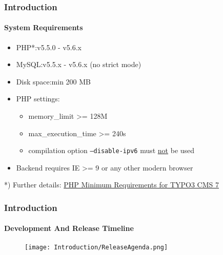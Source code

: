 
\begin{frame}[fragile]
	\frametitle{Introduction}
	\framesubtitle{System Requirements}

	\begin{itemize}
		\item PHP*:\tabto{2.2cm}v5.5.0 - v5.6.x
		\item MySQL:\tabto{2.2cm}v5.5.x - v5.6.x (no strict mode)
		\item Disk space:\tabto{2.2cm}min 200 MB
		\item PHP settings:

			\begin{itemize}
				\item memory\_limit >= 128M
				\item max\_execution\_time >= 240s
				\item compilation option \texttt{--disable-ipv6} must \underline{not} be used
			\end{itemize}

		\item Backend requires IE >= 9 or any other modern browser

	\end{itemize}

	\vspace{1cm}
	*) Further details: \href{http://typo3.org/news/article/php-minimum-requirements-for-typo3-cms-7/}{PHP Minimum Requirements for TYPO3 CMS 7}

\end{frame}


\begin{frame}[fragile]
	\frametitle{Introduction}
	\framesubtitle{Development And Release Timeline}

	\begin{figure}
		\texttt{[image: Introduction/ReleaseAgenda.png]}
	\end{figure}

\end{frame}

